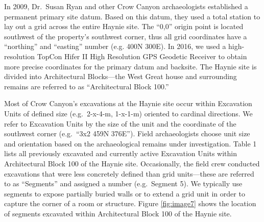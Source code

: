 \documentclass[
  12pt,
]{krantz}
\begin{document}
In 2009, Dr.~Susan Ryan and other Crow Canyon archaeologists established
a permanent primary site datum. Based on this datum, they used a total
station to lay out a grid across the entire Haynie site. The ``0,0''
origin point is located southwest of the property's southwest corner,
thus all grid coordinates have a ``northing'' and ``easting'' number (e.g.
400N 300E). In 2016, we used a high-resolution TopCon Hifer II High
Resolution GPS Geodetic Receiver to obtain more precise coordinates for
the primary datum and backsite. The Haynie site is divided into
Architectural Blocks---the West Great house and surrounding remains are
referred to as ``Architectural Block 100.''

Most of Crow Canyon's excavations at the Haynie site occur within
Excavation Units of defined size (e.g.~2-x-4-m, 1-x-1-m) oriented to
cardinal directions. We refer to Excavation Units by the size of the
unit and the coordinate of the southwest corner (e.g.~``3x2 459N 376E'').
Field archaeologists choose unit size and orientation based on the
archaeological remains under investigation. Table 1 lists all previously
excavated and currently active Excavation Units within Architectural
Block 100 of the Haynie site. Occasionally, the field crew conducted
excavations that were less concretely defined than grid units---these
are referred to as ``Segments'' and assigned a number (e.g.~Segment 5). We
typically use segments to expose partially buried walls or to extend a
grid unit in order to capture the corner of a room or structure. Figure
\ref{fig:image7} shows the location of segments excavated within Architectural Block
100 of the Haynie site.
\end{document}
